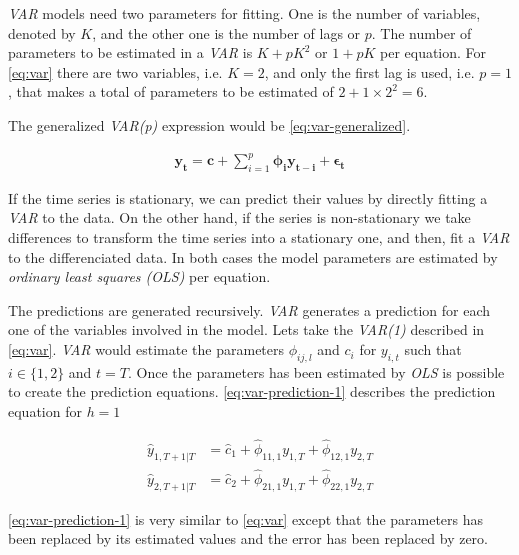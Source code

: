 \textit{VAR} models need two parameters for fitting. One is the number
of variables, denoted by $K$, and the other one is the number of lags
or $p$. The number of parameters to be estimated in a \textit{VAR} is
$K + p K^2$ or $1 + p K$ per equation. For \autoref{eq:var} there are
two variables, i.e. $K=2$, and only the first lag is used, i.e. $p=1$,
that makes a total of parameters to be estimated of
$2 + 1 \times 2^2 = 6$.

The generalized \textit{VAR(p)} expression would be
\autoref{eq:var-generalized}.

\begin{equation}
  \begin{aligned}
    \label{eq:var-generalized}
    \mathbf{y_t} = \mathbf{c} + \displaystyle\sum_{i=1}^p
    \pmb{\phi_i} \mathbf{y_{t-i}} + \pmb{\epsilon_t}
  \end{aligned}
\end{equation}

If the time series is stationary, we can predict their values by
directly fitting a \textit{VAR} to the data. On the other hand, if the
series is non-stationary we take differences to transform the time
series into a stationary one, and then, fit a \textit{VAR} to the
differenciated data. In both cases the model parameters are estimated
by \textit{ordinary least squares (OLS)} per equation.

The predictions are generated recursively. \textit{VAR} generates a
prediction for each one of the variables involved in the model. Lets
take the \textit{VAR(1)} described in \autoref{eq:var}. \textit{VAR}
would estimate the parameters $\phi_{ij,l}$ and $c_i$ for $y_{i,t}$
such that $i \in \{1,2\}$ and $t = T$. Once the parameters has been
estimated by \textit{OLS} is possible to create the prediction
equations. \autoref{eq:var-prediction-1} describes the prediction
equation for $h=1$

\begin{equation}
  \begin{aligned}
    \label{eq:var-prediction-1}
    \hat{y}_{1,T+1|T} & = \hat{c}_1 + \hat{\phi}_{11,1} y_{1,T} +
    \hat{\phi}_{12,1} y_{2,T} \\ 
    \hat{y}_{2,T+1|T} & = \hat{c}_2 + \hat{\phi}_{21,1} y_{1,T} +
    \hat{\phi}_{22,1} y_{2,T}
  \end{aligned}
\end{equation}

\autoref{eq:var-prediction-1} is very similar to \autoref{eq:var}
except that the parameters has been replaced by its estimated values
and the error has been replaced by zero.

